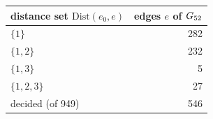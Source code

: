 \begin{tabular}{lr}
\toprule
distance set $\mathrm{Dist}(e_0,e)$ & edges $e$ of $G_{52}$\\
\midrule
$\{1\}$ & 282\\
$\{1,2\}$ & 232\\
$\{1,3\}$ & 5\\
$\{1,2,3\}$ & 27\\
\midrule
decided (of 949) & 546\\
\bottomrule
\end{tabular}

